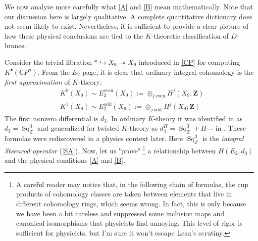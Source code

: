 \documentclass[a4paper,11pt]{article}
\theoremstyle{definition}
\theoremstyle{remark}
\begin{document}
We now analyze more carefully what \eqref{A} and \eqref{B} mean mathematically. Note that our discussion here is largely qualitative. A complete quantitative dictionary does not seem likely to exist. Nevertheless, it is sufficient to provide a clear picture of how these physical conclusions are tied to the $K$-theoretic classification of $D$-branes.

Consider the trivial fibration $*\hookrightarrow X_9\twoheadrightarrow X_9$ introduced in \cref{CP} for computing $K^\bullet({\mathbb{C}P^{n}})$. From the $E_2$-page, it is clear that ordinary integral cohomology is the {\itshape first approximation} of $K$-theory:
\[
\begin{aligned}
&K^0(X_9)\sim E_2^{\mathrm{even}}(X_9):=\oplus_{j\mathrm{~even}}H^j(X_9;\mathbf{Z})\\
&K^1(X_9)\sim E_2^{\mathrm{odd}}(X_9):=\oplus_{j\mathrm{~odd}}H^j(X_9;\mathbf{Z})
\end{aligned}
\]
The first nonzero differential is $d_3$. In ordinary $K$-theory it was identified in \cite{atiyah1961vector} as $d_3=\operatorname{Sq}^3_{\mathbb{Z}}$ and generalized for twisted $K$-theory as $d_3^H=\operatorname{Sq}^3_{\mathbb{Z}}+H\smile$ in \cite{rosenberg1982homological}. These formulae were rediscovered in a physics context \cite{Diaconescu:2000wy} later. Here $\operatorname{Sq}^3_{\mathbb{Z}}$ is the {\itshape integral Steenrod operator} (\cref{SA}). Now, let us "prove" \footnote{A careful reader may notice that, in the following chain of formulas, the cup products of cohomology classes are taken between elements that live in different cohomology rings, which seems wrong. In fact, this is only because we have been a bit careless and suppressed some inclusion maps and canonical isomorphisms that physicists find annoying. This level of rigor is sufficient for physicists, but I’m sure it won’t escape Lean’s scrutiny.
} a relationship between $H(E_2,d_3)$ and the physical conditions \eqref{A} and \eqref{B}.
\end{document}
